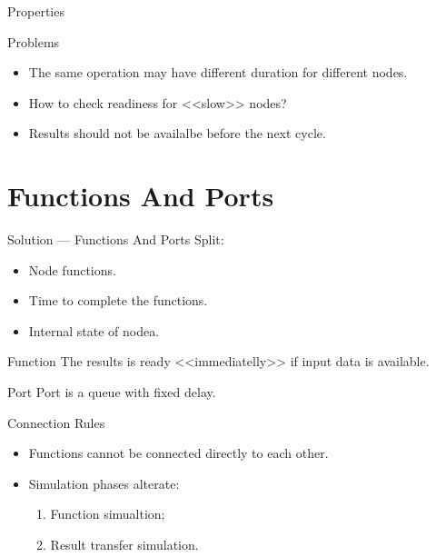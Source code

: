\begin{frame}{Properties}
\centering
{}
\end{frame}

\begin{frame}{Problems}
\begin{itemize}
\item The same operation may have different duration for different nodes.
\item How to check readiness for <<slow>> nodes?
\item Results should not be availalbe before the next cycle.
\end{itemize}
\end{frame}

\section{Functions And Ports}

\begin{frame}{Solution --- Functions And Ports}
Split:
\begin{itemize}
\item Node functions.
\item Time to complete the functions.
\item Internal state of nodea.
\end{itemize}
\end{frame}

\begin{frame}{Function}
The results is ready <<immediatelly>> if input data is available.
\vfill
\centering
{}
\end{frame}

\begin{frame}{Port}
Port is a queue with fixed delay.
\vfill
\centering
{}
\end{frame}

\begin{frame}{Connection Rules}
\begin{itemize}
\item Functions cannot be connected directly to each other.
\item Simulation phases alterate:
  \begin{enumerate}
  \item Function simualtion;
  \item Result transfer simulation.
  \end{enumerate}
\end{itemize}
\end{frame}

